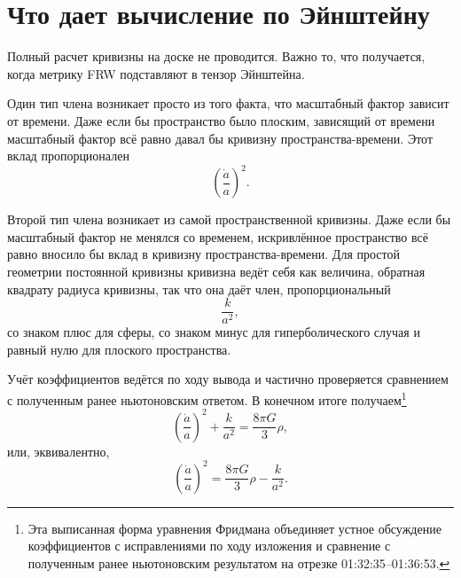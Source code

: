 \begin{classroomqa}
\end{classroomqa}

\section{Что дает вычисление по Эйнштейну}

Полный расчет кривизны на доске не проводится. Важно то, что получается, когда метрику FRW подставляют в тензор Эйнштейна.

Один тип члена возникает просто из того факта, что масштабный фактор зависит от времени. Даже если бы пространство было плоским, зависящий от времени масштабный фактор всё равно давал бы кривизну пространства-времени. Этот вклад пропорционален
\begin{equation}
\left(\frac{\dot a}{a}\right)^2.
\end{equation}

Второй тип члена возникает из самой пространственной кривизны. Даже если бы масштабный фактор не менялся со временем, искривлённое пространство всё равно вносило бы вклад в кривизну пространства-времени. Для простой геометрии постоянной кривизны кривизна ведёт себя как величина, обратная квадрату радиуса кривизны, так что она даёт член, пропорциональный
\begin{equation}
\frac{k}{a^2},
\end{equation}
со знаком плюс для сферы, со знаком минус для гиперболического случая и равный нулю для плоского пространства.

\begin{classroomqa}
\end{classroomqa}

Учёт коэффициентов ведётся по ходу вывода и частично проверяется сравнением с полученным ранее ньютоновским ответом. В конечном итоге получаем\footnote{Эта выписанная форма уравнения Фридмана объединяет устное обсуждение коэффициентов с исправлениями по ходу изложения и сравнение с полученным ранее ньютоновским результатом на отрезке 01:32:35--01:36:53.}
\begin{equation}
\left(\frac{\dot a}{a}\right)^2+\frac{k}{a^2}=\frac{8\pi G}{3}\rho,
\end{equation}
или, эквивалентно,
\begin{equation}
\left(\frac{\dot a}{a}\right)^2=\frac{8\pi G}{3}\rho-\frac{k}{a^2}.
\end{equation}

